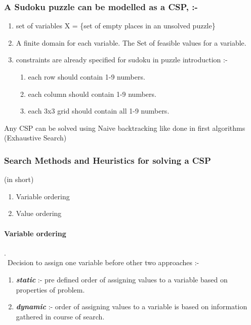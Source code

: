 \documentclass[11pt]{article}
\begin{document}
\subsubsection{A Sudoku puzzle can be modelled as a CSP, :-}
\begin{enumerate}[label=(\alph*)]
\item set of variables X = \{set of empty places in an unsolved puzzle\}
\item A finite domain for each variable. The Set of feasible values for a variable.
\item constraints are already specified for sudoku in puzzle introduction :-
\begin{enumerate}[label=(\roman*)]
\item each row should contain 1-9 numbers.
\item each column should contain 1-9 numbers.
\item each 3x3 grid should contain all 1-9 numbers.
\end{enumerate}
\end{enumerate}
Any CSP can be solved using Naive backtracking like done in first algorithms (Exhaustive Search)
\subsubsection{Search Methods and Heuristics for solving a CSP }
(in short)
\begin{enumerate}[label= (\arabic*)]
\item Variable ordering
\item Value ordering
\end{enumerate}

\paragraph{ Variable ordering}
.\\
\quad \quad \  Decision to assign one variable before other
two approaches :-
\begin{enumerate}[label=(\arabic*)]
\item \emph{\textbf{static}} :- pre defined order of assigning values to a variable based on properties of problem.
\item \emph{\textbf{dynamic}} :- order of assigning values to a variable is based on information gathered in course of search.
\end{enumerate}
\end{document}
